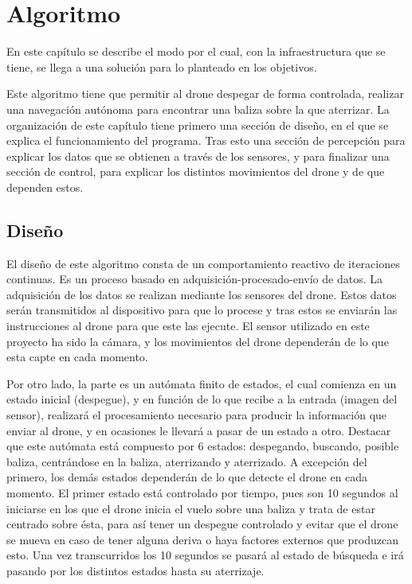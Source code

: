 \chapter{Algoritmo}\label{cap.algoritmo} %

\hspace{1 cm} En este cap\'itulo se describe el modo por el cual, con la infraestructura que se tiene, se llega a una soluci\'on para lo planteado en los objetivos. 

\hspace{1 cm} Este algoritmo tiene que permitir al drone despegar de forma controlada, realizar una navegaci\'on aut\'onoma para encontrar una baliza sobre la que aterrizar. La organizaci\'on de este cap\'itulo tiene primero una secci\'on de diseño, en el que se explica el funcionamiento del programa. Tras esto una secci\'on de percepci\'on para explicar los datos que se obtienen a trav\'es de los sensores, y para finalizar una secci\'on de control, para explicar los distintos movimientos del drone y de que dependen estos. %

\section{Diseño}
\label{sec.Design}

\hspace{1 cm} El diseño de este algoritmo consta de un comportamiento reactivo de iteraciones continuas. Es un proceso basado en adquisici\'on-procesado-env\'io de datos. La adquisici\'on de los datos se realizan mediante los sensores del drone. Estos datos ser\'an transmitidos al dispositivo para que lo procese y tras estos se enviar\'an las instrucciones al drone para que este las ejecute. El sensor utilizado en este proyecto ha sido la c\'amara, y los movimientos del drone depender\'an de lo que esta capte en cada momento. 

\hspace{1 cm} Por otro lado, la parte es un aut\'omata finito de estados, el cual comienza en un estado inicial (despegue), y en funci\'on de lo que recibe a la entrada (imagen del sensor), realizar\'a el procesamiento necesario para producir la informaci\'on que enviar al drone, y en ocasiones le llevar\'a a pasar de un estado a otro. Destacar que este aut\'omata est\'a compuesto por 6 estados: despegando, buscando, posible baliza, centr\'andose en la baliza, aterrizando y aterrizado. A excepci\'on del primero, los dem\'as estados depender\'an de lo que detecte el drone en cada momento. El primer estado est\'a controlado por tiempo, pues son 10 segundos al iniciarse en los que el drone inicia el vuelo sobre una baliza y trata de estar centrado sobre \'esta, para as\'i tener un despegue controlado y evitar que el drone se mueva en caso de tener alguna deriva o haya factores externos que produzcan esto. Una vez transcurridos los 10 segundos se pasar\'a al estado de b\'usqueda e ir\'a pasando por los distintos estados hasta su aterrizaje. 

